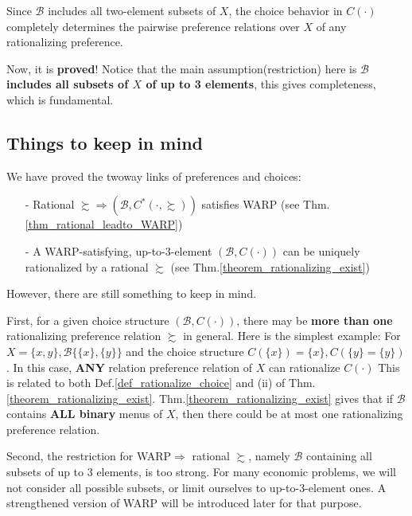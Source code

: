 \begin{enumerate}
    Since $\mathcal{B}$ includes all two-element subsets of $X$, the choice behavior in $C(\cdot)$ completely determines the pairwise preference relations over $X$ of any rationalizing preference.
\end{enumerate}

Now, it is \textbf{proved}! Notice that the main assumption(restriction) here is \textbf{$\mathcal{B}$ includes all subsets of $X$ of up to 3 elements}, this gives completeness, which is fundamental.

\subsection*{Things to keep in mind}
We have proved the twoway links of preferences and choices:
\begin{enumerate}
    \item[-] Rational $\succsim\Rightarrow (\mathcal{B},C^*(\cdot,\succsim))$ satisfies WARP (see Thm.\ref{thm_rational_leadto_WARP})
    \item[-] A WARP-satisfying, up-to-3-element $(\mathcal{B},C(\cdot))$ can be uniquely rationalized by a rational $\succsim$ (see Thm.\ref{theorem_rationalizing_exist})
\end{enumerate}
However, there are still something to keep in mind.

First, for a given choice structure $(\mathcal{B},C(\cdot))$, there may be \textbf{more than one} rationalizing preference relation $\succsim$ in general. Here is the simplest example:
For $X=\{x,y\},\mathcal{B}\{\{x\},\{y\}\}$ and the choice structure $C(\{x\})=\{x\}, C(\{y\}=\{y\})$. In this case, \textbf{ANY} relation preference relation of $X$ can rationalize $C(\cdot)$
This is related to both Def.\ref{def_rationalize_choice} and (ii) of Thm.\ref{theorem_rationalizing_exist}. Thm.\ref{theorem_rationalizing_exist} gives that if $\mathcal{B}$ contains \textbf{ALL binary} menus of $X$,
then there could be at most one rationalizing preference relation.

Second, the restriction for WARP$\Rightarrow$ rational $\succsim$, namely $\mathcal{B}$ containing all subsets of up to 3 elements, is too strong. For many economic problems, we will not consider all possible subsets, or limit ourselves to up-to-3-element ones. A strengthened version of WARP will be introduced later for that purpose.

